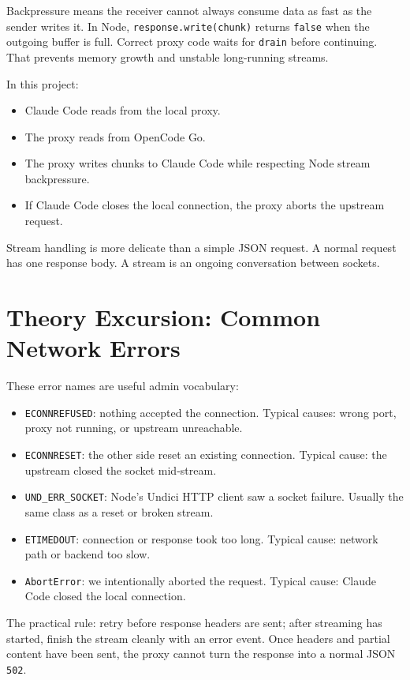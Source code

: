 \documentclass[11pt,a4paper]{article}
\newcommand{\code}[1]{\texttt{#1}}
\begin{document}
Backpressure means the receiver cannot always consume data as fast as the
sender writes it. In Node, \code{response.write(chunk)} returns \code{false}
when the outgoing buffer is full. Correct proxy code waits for \code{drain}
before continuing. That prevents memory growth and unstable long-running
streams.

In this project:

\begin{itemize}
  \item Claude Code reads from the local proxy.
  \item The proxy reads from OpenCode Go.
  \item The proxy writes chunks to Claude Code while respecting Node stream backpressure.
  \item If Claude Code closes the local connection, the proxy aborts the upstream request.
\end{itemize}

Stream handling is more delicate than a simple JSON request. A normal request
has one response body. A stream is an ongoing conversation between sockets.

\section{Theory Excursion: Common Network Errors}

These error names are useful admin vocabulary:

\begin{itemize}
  \item \code{ECONNREFUSED}: nothing accepted the connection. Typical causes: wrong port, proxy not running, or upstream unreachable.
  \item \code{ECONNRESET}: the other side reset an existing connection. Typical cause: the upstream closed the socket mid-stream.
  \item \code{UND\_ERR\_SOCKET}: Node's Undici HTTP client saw a socket failure. Usually the same class as a reset or broken stream.
  \item \code{ETIMEDOUT}: connection or response took too long. Typical cause: network path or backend too slow.
  \item \code{AbortError}: we intentionally aborted the request. Typical cause: Claude Code closed the local connection.
\end{itemize}

The practical rule: retry before response headers are sent; after streaming has
started, finish the stream cleanly with an error event. Once headers and
partial content have been sent, the proxy cannot turn the response into a
normal JSON \code{502}.
\end{document}
